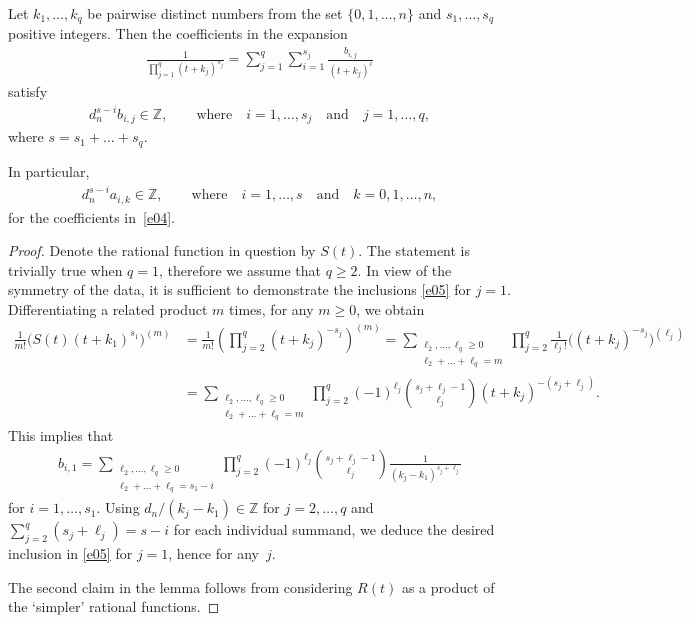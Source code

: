 \documentclass[pdftex]{sigma}
\begin{document}
\begin{lemma}\label{l1}
Let $k_1,\dots,k_q$ be pairwise distinct numbers from the set $\{0,1,\dots,n\}$ and $s_1,\dots,s_q$ positive integers. Then the coefficients in the expansion
\begin{gather*}
\frac1{\prod_{j=1}^q(t+k_j)^{s_j}} =\sum_{j=1}^q\sum_{i=1}^{s_j}\frac{b_{i,j}}{(t+k_j)^i}
\end{gather*}
satisfy
\begin{gather} d_n^{s-i}b_{i,j}\in\mathbb Z, \qquad\text{where}\quad i=1,\dots,s_j \quad \text{and}\quad j=1,\dots,q, \label{e05}
\end{gather}
where $s=s_1+\dots+s_q$.

In particular,
\begin{gather}
d_n^{s-i}a_{i,k}\in\mathbb Z, \qquad\text{where}\quad i=1,\dots,s \quad \text{and}\quad k=0,1,\dots,n, \label{e06}
\end{gather}
for the coefficients in~\eqref{e04}.
\end{lemma}

\begin{proof} Denote the rational function in question by $S(t)$. The statement is trivially true when $q=1$, therefore we assume that $q\ge2$. In view of the symmetry of the data, it is sufficient to demonstrate the inclusions \eqref{e05} for $j=1$. Differentiating a related product $m$ times, for any $m\ge0$, we obtain
\begin{align*}
\frac1{m!}\bigl(S(t)(t+k_1)^{s_1}\bigr)^{(m)}
&=\frac1{m!}\left(\prod_{j=2}^q(t+k_j)^{-s_j}\right)^{(m)}
=\sum_{\substack{\ell_2,\dots,\ell_q\ge0\\ \ell_2+\dots+\ell_q=m}}\prod_{j=2}^q\frac1{\ell_j!}\bigl((t+k_j)^{-s_j}\bigr)^{(\ell_j)}\\
&=\sum_{\substack{\ell_2,\dots,\ell_q\ge0\\ \ell_2+\dots+\ell_q=m}}\prod_{j=2}^q(-1)^{\ell_j}\binom{s_j+\ell_j-1}{\ell_j}(t+k_j)^{-(s_j+\ell_j)}.
\end{align*}
This implies that
\begin{gather*}
b_{i,1}=\sum_{\substack{\ell_2,\dots,\ell_q\ge0\\ \ell_2+\dots+\ell_q=s_1-i}}
\prod_{j=2}^q(-1)^{\ell_j}\binom{s_j+\ell_j-1}{\ell_j}\frac1{(k_j-k_1)^{s_j+\ell_j}}
\end{gather*}
for $i=1,\dots,s_1$. Using $d_n/(k_j-k_1)\in\mathbb Z$ for $j=2,\dots,q$ and $\sum_{j=2}^q(s_j+\ell_j)=s-i$ for each individual summand, we deduce the desired inclusion in \eqref{e05} for $j=1$, hence for any~$j$.

The second claim in the lemma follows from considering $R(t)$ as a product of the `simpler' rational functions.
\end{proof}
\end{document}
